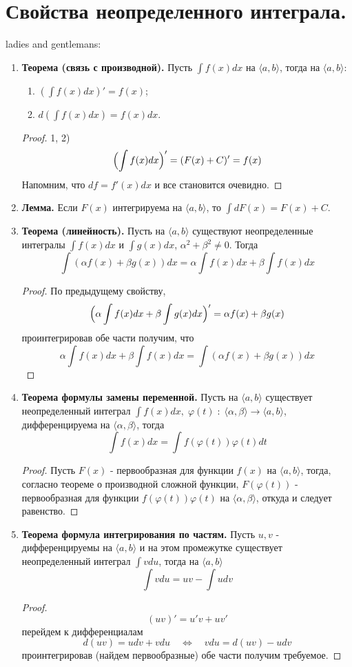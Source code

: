 \documentclass{article}
\newcommand*{\lemma}[1]{\textbf{Лемма.} #1. \newline}
\newcommand*{\theorem}[2]{\textbf{Теорема #1. } #2 \newline}
\begin{document}
\section{Свойства неопределенного интеграла.}
ladies and gentlemans:
\begin{enumerate}
    \item \theorem{(связь с производной)}{Пусть $\int f(x)dx$ на $\langle a, b \rangle$, тогда на $\langle a, b \rangle$: }
    \begin{enumerate}
        \item $(\int f(x)dx)' = f(x)$;
        \item $d(\int f(x)dx) = f(x)dx$.
    \end{enumerate}
    \begin{proof}
        1, 2)
        $$
            \Bigl(\int f(x)dx \Bigr)' = (F(x) + C)' = f(x)
        $$
        Напомним, что $df = f'(x)dx$ и все становится очевидно.
    \end{proof}
    \item \lemma{Если $F(x)$ интегрируема на $\langle a, b \rangle$, то $\int dF(x) = F(x) + C$}
    \item \theorem{(линейность)}{Пусть на $\langle a, b \rangle$ существуют неопределенные интегралы $\int f(x)dx$ и $\int g(x)dx$, $\alpha^2 + \beta^2 \neq 0$. Тогда}
    $$
        \int (\alpha f(x) + \beta g(x))dx = \alpha\int f(x)dx + \beta\int f(x)dx
    $$
    \begin{proof}
        По предыдущему свойству,
        $$
            \Bigl(\alpha \int f(x)dx + \beta \int g(x)dx \Bigr)' = \alpha f(x) + \beta g(x)
        $$
        проинтегрировав обе части получим, что 
        $$  
            \alpha\int f(x)dx + \beta\int f(x)dx = \int (\alpha f(x) + \beta g(x))dx
        $$
    \end{proof}
    \item \theorem{формулы замены переменной}{Пусть на $\langle a, b \rangle$ существует неопределенный интеграл $\int f(x)dx, \; \varphi(t) \; : \; \langle \alpha, \beta \rangle \to \langle a, b \rangle$, дифференцируема на $\langle \alpha, \beta \rangle$, тогда}
    $$
        \int f(x)dx = \int f(\varphi(t))\varphi(t)dt 
    $$
    \begin{proof}
        Пусть $F(x)$ - первообразная для функции $f(x)$ на $\langle a, b \rangle$, тогда, согласно теореме о производной сложной функции, $F(\varphi(t))$ - первообразная для функции $f(\varphi(t))\varphi(t)$ на $\langle \alpha, \beta \rangle$, откуда и следует равенство.
    \end{proof}
    \item \theorem{формула интегрирования по частям}{Пусть $u, v$ - дифференцируемы на $\langle a, b \rangle$ и на этом промежутке существует неопределенный интеграл $\int vdu$, тогда на $\langle a, b \rangle$}
    $$
        \int vdu = uv - \int udv
    $$
    \begin{proof}
        $$
            (uv)' = u'v + uv'
        $$
        перейдем к дифференциалам
        $$
            d(uv) = udv + vdu \quad \Leftrightarrow \quad vdu = d(uv) - udv
        $$
        проинтегрировав (найдем первообразные) обе части получим требуемое.
    \end{proof}
\end{enumerate}
\end{document}
